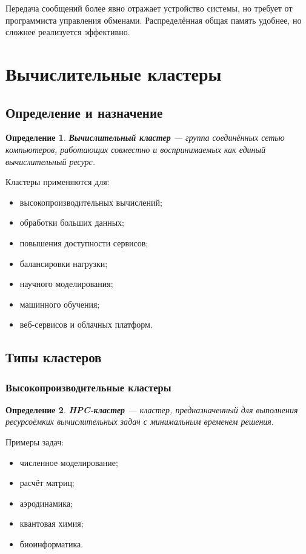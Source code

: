 \documentclass[12pt,a4paper]{article}
\newtheorem{definition}{Определение}
\begin{document}
Передача сообщений более явно отражает устройство системы, но требует от программиста управления обменами. Распределённая общая память удобнее, но сложнее реализуется эффективно.

\section{Вычислительные кластеры}

\subsection{Определение и назначение}

\begin{definition}
\textbf{Вычислительный кластер} --- группа соединённых сетью компьютеров, работающих совместно и воспринимаемых как единый вычислительный ресурс.
\end{definition}

Кластеры применяются для:
\begin{itemize}
    \item высокопроизводительных вычислений;
    \item обработки больших данных;
    \item повышения доступности сервисов;
    \item балансировки нагрузки;
    \item научного моделирования;
    \item машинного обучения;
    \item веб-сервисов и облачных платформ.
\end{itemize}

\subsection{Типы кластеров}

\subsubsection{Высокопроизводительные кластеры}

\begin{definition}
\textbf{HPC-кластер} --- кластер, предназначенный для выполнения ресурсоёмких вычислительных задач с минимальным временем решения.
\end{definition}

Примеры задач:
\begin{itemize}
    \item численное моделирование;
    \item расчёт матриц;
    \item аэродинамика;
    \item квантовая химия;
    \item биоинформатика.
\end{itemize}
\end{document}
